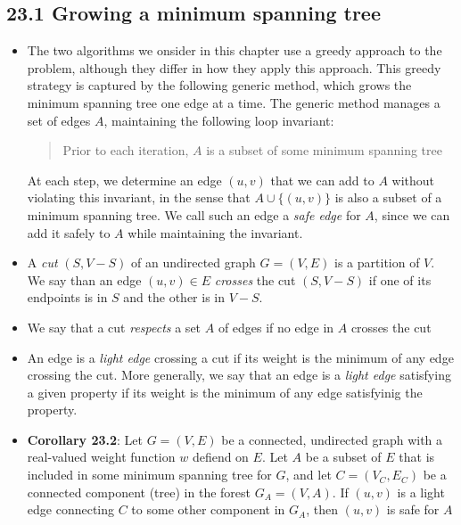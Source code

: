 \documentclass{report}
\begin{document}
\subsection*{23.1 Growing a minimum spanning tree}
\begin{itemize}
    \item The two algorithms we onsider in this chapter use a greedy approach to the problem, although they differ in how they apply this approach. This greedy strategy is captured by the following generic method, which grows the minimum spanning tree one edge at a time. The generic method manages a set of edges $A$, maintaining the following loop invariant:
    \begin{quote}
        Prior to each iteration, $A$ is a subset of some minimum spanning tree
    \end{quote}
    At each step, we determine an edge $(u, v)$ that we can add to $A$ without violating this invariant, in the sense that $A \cup \{(u, v)\}$ is also a subset of a minimum spanning tree. We call such an edge a \textit{safe edge} for $A$, since we can add it safely to $A$ while maintaining the invariant.
    \item A \textit{cut} $(S, V - S)$ of an undirected graph $G = (V, E)$ is a partition of $V$. We say than an edge $(u, v) \in E$ \textit{crosses} the cut $(S, V - S)$ if one of its endpoints is in $S$ and the other is in $V - S$.
    \item We say that a cut \textit{respects} a set $A$ of edges if no edge in $A$ crosses the cut
    \item An edge is a \textit{light edge} crossing a cut if its weight is the minimum of any edge crossing the cut. More generally, we say that an edge is a \textit{light edge} satisfying a given property if its weight is the minimum of any edge satisfyinig the property.
    \item \textbf{Corollary 23.2}: Let $G = (V, E)$ be a connected, undirected graph with a real-valued weight function $w$ defiend on $E$. Let $A$ be a subset of $E$ that is included in some minimum spanning tree for $G$, and let $C = (V_C, E_C)$ be a connected component (tree) in the forest $G_A = (V, A)$. If $(u, v)$ is a light edge connecting $C$ to some other component in $G_A$, then $(u, v)$ is safe for $A$
\end{itemize}
\end{document}
